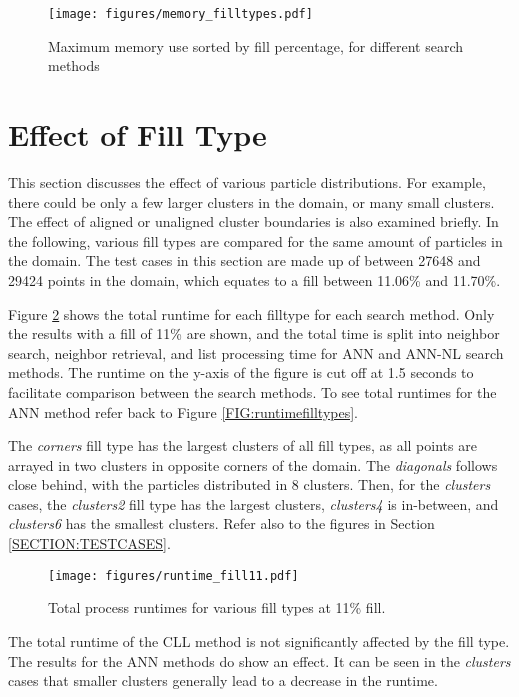 \begin{figure}[h]
	\centering
	\texttt{[image: figures/memory\_filltypes.pdf]}
	\caption{Maximum memory use sorted by fill percentage, for different search methods} 
	\label{FIG:memoryfilltypes}
\end{figure}

\section{Effect of Fill Type}
\label{SECTION:ANALYSISFILLTYPE}

This section discusses the effect of various particle distributions. For example, there could be only a few larger clusters in the domain, or many small clusters. The effect of aligned or unaligned cluster boundaries is also examined briefly. In the following, various fill types are compared for the same amount of particles in the domain. The test cases in this section are made up of between 27648 and 29424 points in the domain, which equates to a fill between 11.06\% and 11.70\%.

Figure \ref{FIG:runtimefill11} shows the total runtime for each filltype for each search method. Only the results with a fill of 11\% are shown, and the total time is split into neighbor search, neighbor retrieval, and list processing time for ANN and ANN-NL search methods. The runtime on the y-axis of the figure is cut off at 1.5 seconds to facilitate comparison between the search methods. To see total runtimes for the ANN method refer back to Figure \ref{FIG:runtimefilltypes}.

The {\itshape corners} fill type has the largest clusters of all fill types, as all points are arrayed in two clusters in opposite corners of the domain. The {\itshape diagonals} follows close behind, with the particles distributed in 8 clusters. Then, for the {\itshape clusters} cases, the {\itshape clusters2} fill type has the largest clusters, {\itshape clusters4} is in-between, and {\itshape clusters6} has the smallest clusters. Refer also to the figures in Section \ref{SECTION:TESTCASES}.

\begin{figure}[h]
	\centering
	\texttt{[image: figures/runtime\_fill11.pdf]}
	\caption{Total process runtimes for various fill types at 11\% fill.}
	\label{FIG:runtimefill11}
\end{figure}

The total runtime of the CLL method is not significantly affected by the fill type. The results for the ANN methods do show an effect. It can be seen in the {\itshape clusters} cases that smaller clusters generally lead to a decrease in the runtime.

